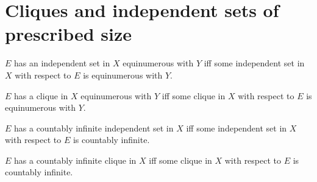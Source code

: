 \section{Cliques and independent sets of prescribed size}




\begin{abbreviation}\label{has_equinumerous_independent_set}
    $E$ has an independent set in $X$ equinumerous with $Y$ iff
        some independent set in $X$ with respect to $E$
            is equinumerous with $Y$.
\end{abbreviation}

\begin{abbreviation}\label{has_equinumerous_clique}
    $E$ has a clique in $X$ equinumerous with $Y$ iff
        some clique in $X$ with respect to $E$ is equinumerous with $Y$.
\end{abbreviation}

\begin{abbreviation}\label{has_countably_infinite_independent_set}
    $E$ has a countably infinite independent set in $X$ iff
        some independent set in $X$ with respect to $E$ is countably infinite.
\end{abbreviation}

\begin{abbreviation}\label{has_countably_infinite_clique}
    $E$ has a countably infinite clique in $X$ iff
        some clique in $X$ with respect to $E$ is countably infinite.
\end{abbreviation}
